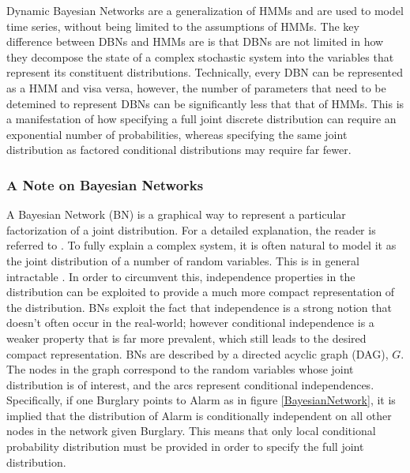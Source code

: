 \placeholder{}
Dynamic Bayesian Networks are a generalization of HMMs and are used to model time series, without being limited to the assumptions of HMMs. The key difference between DBNs and HMMs are is that DBNs are not limited in how they decompose the state of a complex stochastic system into the variables that represent its constituent distributions\cite{AIAMA}. Technically, every DBN can be represented as a HMM and visa versa, however, the number of parameters that need to be detemined to represent DBNs can be significantly less that that of HMMs. This is a manifestation of how specifying a full joint discrete distribution can require an exponential number of probabilities, whereas specifying the same joint distribution as factored conditional distributions may require far fewer.

\subsubsection{A Note on Bayesian Networks}
A Bayesian Network (BN) is a graphical way to represent a particular factorization of a joint distribution. For a detailed explanation, the reader is referred to \cite{KollerPGM}. To fully explain a complex system, it is often natural to model it as the joint distribution of a number of random variables. This is in general intractable \cite{KollerPGM}. In order to circumvent this, independence properties in the distribution can be exploited to provide a much more compact representation of the distribution. BNs exploit the fact that independence is a strong notion that doesn't often occur in the real-world; however conditional independence is a weaker property that is far more prevalent, which still leads to the desired compact representation. BNs are described by a directed acyclic graph (DAG), $G$. The nodes in the graph correspond to the random variables whose joint distribution is of interest, and the arcs represent conditional independences. Specifically, if one Burglary points to Alarm as in figure \ref{BayesianNetwork}, it is implied that the distribution of Alarm is conditionally independent on all other nodes in the network given Burglary. This means that only local conditional probability distribution must be provided in order to specify the full joint distribution.

